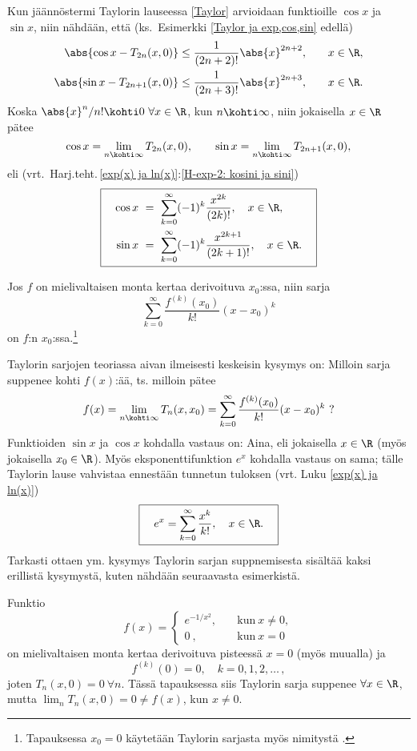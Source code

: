 Kun jäännöstermi Taylorin lauseessa \ref{Taylor} arvioidaan funktioille $\cos x$ ja $\sin x$, 
niin nähdään, että (ks.\ Esimerkki \ref{Taylor ja exp,cos,sin} edellä)
\begin{alignat*}{2}
\abs{\cos x -T_{2n}(x,0)}   &\leq \frac{1}{(2n+2)!}\abs{x}^{2n+2},\quad &x\in\R, \\
\abs{\sin x -T_{2n+1}(x,0)} &\leq \frac{1}{(2n+3)!}\abs{x}^{2n+3},\quad &x\in\R.
\end{alignat*}
Koska $\abs{x}^n/n!\kohti 0 \ \forall x\in\R$, kun $n\kohti\infty$, niin jokaisella $x\in\R$
pätee
\[ 
\cos x = \lim_{n\kohti\infty}T_{2n}(x,0), \qquad \sin x = \lim_{n\kohti\infty} T_{2n+1}(x,0),
\] 
eli (vrt.\ Harj.teht.\,\ref{exp(x) ja ln(x)}:\ref{H-exp-2: kosini ja sini})
\[
\boxed{\begin{aligned}
\quad\cos x\ &=\ \sum_{k=0}^\infty (-1)^k\frac{x^{2k}}{(2k)!}, \quad x\in\R, \\
     \sin x\ &=\ \sum_{k=0}^\infty (-1)^k\frac{x^{2k+1}}{(2k+1)!}, \quad x\in\R. \quad
\end{aligned}}
\]
\begin{Def}
Jos $f$ on mielivaltaisen monta kertaa derivoituva $x_0$:ssa, niin sarja
\[
\sum_{k=0}^\infty \frac{f^{(k)}(x_0)}{k!}(x-x_0)^k 
\]
on $f$:n  $x_0$:ssa.\footnote[2]{Tapauksessa $x_0=0$ käytetään Taylorin
sarjasta myös nimitystä . }
\end{Def}
Taylorin sarjojen teoriassa aivan ilmeisesti keskeisin kysymys on: Milloin sarja suppenee
kohti $f(x)$:ää, ts. milloin pätee
\[
f(x)=\lim_{n\kohti\infty} T_n(x,x_0)=\sum_{k=0}^\infty \frac{f^{(k)}(x_0)}{k!}(x-x_0)^k \ ?
\]
Funktioiden $\sin x$ ja $\cos x$ kohdalla vastaus on: Aina, eli jokaisella $x\in\R$ 
(myös jokaisella $x_0 \in \R$). Myös eksponenttifunktion $e^x$ kohdalla vastaus on sama; tälle
Taylorin lause vahvistaa ennestään tunnetun tuloksen (vrt. Luku \ref{exp(x) ja ln(x)})
\[
\boxed{\quad e^x=\sum_{k=0}^\infty \frac{x^k}{k!}, \quad x\in\R. \quad}
\]
Tarkasti ottaen ym. kysymys Taylorin sarjan suppnemisesta sisältää kaksi erillistä
kysymystä, kuten nähdään seuraavasta esimerkistä.
\begin{Exa} \label{outo Taylorin sarja} Funktio
\[
f(x)=\begin{cases}
e^{-1/x^2}, \quad   &\text{kun}\ x \neq 0, \\
0\ ,                &\text{kun}\ x = 0
\end{cases}
\]
on mielivaltaisen monta kertaa derivoituva pisteessä $x=0$ (myös muualla) ja
\[
f^{(k)}(0)=0,\quad k=0,1,2,\ldots\,,
\]
joten $T_n(x,0)=0 \ \forall n$. Tässä tapauksessa siis Taylorin sarja suppenee $\forall x\in\R$,
mutta $\lim_n T_n(x,0) = 0 \neq f(x)$, kun $x \neq 0 $. \loppu
\end{Exa}
